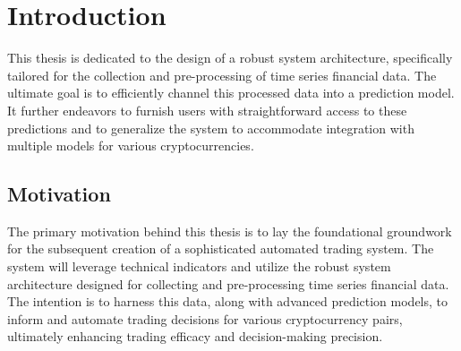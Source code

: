 \chapter{Introduction}

This thesis is dedicated to the design of a robust system architecture, specifically tailored for the collection and pre-processing of time series financial data. The ultimate goal is to efficiently channel this processed data into a prediction model.
It further endeavors to furnish users with straightforward access to these predictions and to generalize the system to accommodate integration with multiple models for various cryptocurrencies.

\section{Motivation}
The primary motivation behind this thesis is to lay the foundational groundwork for the subsequent creation of a sophisticated automated trading system. The system will leverage technical indicators and utilize the robust system architecture designed for collecting and pre-processing time series financial data. The intention is to harness this data, along with advanced prediction models, to inform and automate trading decisions for various cryptocurrency pairs, ultimately enhancing trading efficacy and decision-making precision.

